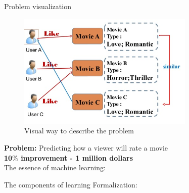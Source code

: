 \documentclass{beamer}
\begin{document}
\begin{frame}{Problem visualization}
\begin{figure}
  \centering
    \includegraphics[width=0.75\textwidth]{movierecommendation}
  		\caption{ Visual way to describe the problem }
    \label{movie recommendation netflix}
 \end{figure}
\end{frame}

\begin{frame}{}
\textbf{Problem:} Predicting how a viewer will rate a movie \\
\textbf{10$\%$ improvement - 1 million dollars} \\
The essence of machine learning: 
\begin{enumerate}
\end{enumerate}
\end{frame}

\begin{frame}{The components of learning}
Formalization: 
\begin{enumerate}
\end{enumerate}
\end{frame}
\end{document}
